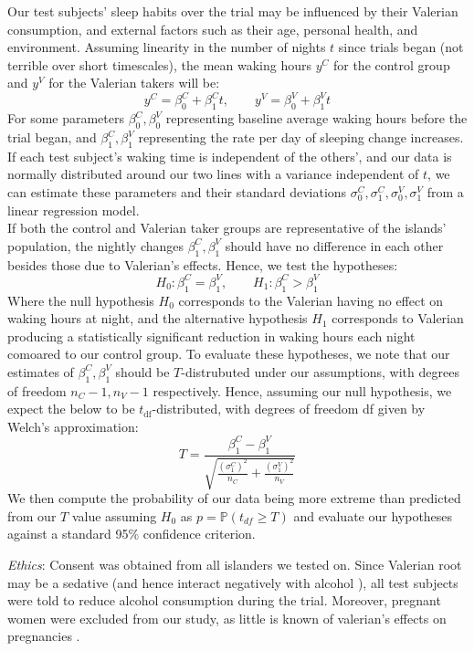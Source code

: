 \documentclass[10pt,preprintnumbers,amsmath,amssymb,floatfix,twocolumn,prl]{revtex4-2}
\begin{document}
Our test subjects' sleep habits over the trial may be influenced by their Valerian consumption, and external factors such as their age, personal health, and environment. Assuming linearity in the number of nights $t$ since trials began (not terrible over short timescales), the mean waking hours $y^C$ for the control group and $y^V$ for the Valerian takers will be:
$$y^C = \beta_0^C + \beta_1^C t, \qquad y^V = \beta_0^V + \beta_1^V t$$
For some parameters $\beta_0^C, \beta_0^V$ representing baseline average waking hours before the trial began, and $\beta_1^C, \beta_1^V$ representing the rate per day of sleeping change increases. If each test subject's waking time is independent of the others', and our data is normally distributed around our two lines with a variance independent of $t$, we can estimate these parameters and their standard deviations $\sigma_0^C, \sigma_1^C, \sigma_0^V, \sigma_1^V$ from a linear regression model. \\

If both the control and Valerian taker groups are representative of the islands' population, the nightly changes $\beta_1^C, \beta_1^V$ should have no difference in each other besides those due to Valerian's effects. Hence, we test the hypotheses:
$$H_0: \beta_1^C = \beta_1^V, \qquad H_1: \beta_1^C > \beta_1^V$$
Where the null hypothesis $H_0$ corresponds to the Valerian having no effect on waking hours at night, and the alternative hypothesis $H_1$ corresponds to Valerian producing a statistically significant reduction in waking hours each night comoared to our control group. To evaluate these hypotheses, we note that our estimates of $\beta_1^C, \beta_1^V$ should be $T$-distrubuted under our assumptions, with degrees of freedom $n_C - 1, n_V - 1$ respectively. Hence, assuming our null hypothesis, we expect the below to be $t_\text{df}$-distributed, with degrees of freedom df given by Welch's approximation:
$$T = \frac{\beta_1^C - \beta_1^V}{\sqrt{\frac{(\sigma_1^C)^2}{n_C} + \frac{(\sigma_1^V)^2}{n_V}}}$$
We then compute the probability of our data being more extreme than predicted from our $T$ value assuming $H_0$ as $p = \mathbb{P}(t_{df} \geq T)$ and evaluate our hypotheses against a standard 95\% confidence criterion.

\textit{Ethics}: Consent was obtained from all islanders we tested on. Since Valerian root may be a sedative (and hence interact negatively with alcohol \cite{ValerianSource1}), all test subjects were told to reduce alcohol consumption during the trial. Moreover, pregnant women were excluded from our study, as little is known of valerian's effects on pregnancies \cite{ValerianSource2}. 
\end{document}
